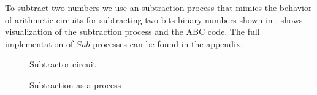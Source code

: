 To subtract two numbers we use an subtraction process that mimics the behavior of arithmetic circuits for subtracting two bits binary numbers shown in 
.
 shows visualization of the subtraction process and the ABC code.
The full implementation of $Sub$ processes can be found in the appendix.
\begin{figure}[H]%
\centering
{}
\caption{Subtractor circuit}
\label{tra_subtract_circuit}%
\end{figure}
\begin{figure}[H]%
\centering
{}%
\hspace{1em}%
%
\vspace{2em}
%
\caption{Subtraction as a process}
\label{tra_subttraction}%
\end{figure}
